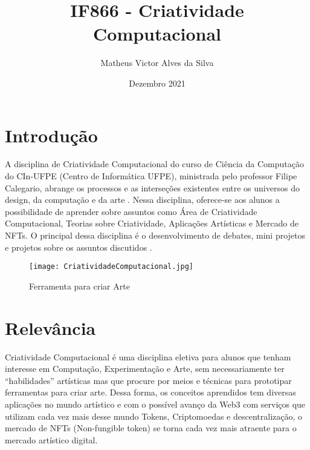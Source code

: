 \documentclass{article}
\title{IF866 - Criatividade Computacional}
\author{Matheus Victor Alves da Silva}
\date{\vspace{-5ex}}
\date{Dezembro 2021}
\begin{document}
\maketitle

\section{Introdução}
A disciplina de Criatividade Computacional do curso de Ciência da Computação do CIn-UFPE (Centro de Informática UFPE), ministrada pelo professor Filipe Calegario, abrange os processos e as interseções existentes entre os universos do design, da computação e da arte  \citep{SharePET}. Nessa disciplina, oferece-se aos alunos a possibilidade de aprender sobre assuntos como  Área de Criatividade Computacional, Teorias sobre Criatividade, Aplicações Artísticas e Mercado de NFTs. O principal dessa disciplina é o desenvolvimento de debates, mini projetos e projetos sobre os assuntos discutidos  \citep{Disciplina}.

\begin{figure}[h!]
\centering
\texttt{[image: CriatividadeComputacional.jpg]}
\caption{Ferramenta para criar Arte  \citep{Imagem}}
\label{fig: CriatividadeComputacional.jpg}
\end{figure}

\section{Relevância}
Criatividade Computacional é uma disciplina eletiva para alunos que tenham interesse em Computação, Experimentação e Arte, sem necessariamente ter “habilidades” artísticas mas que procure por meios e técnicas para prototipar ferramentas para criar arte. Dessa forma, os conceitos aprendidos tem diversas aplicações no mundo artístico e com o possível avanço da Web3 com serviços que utilizam cada vez mais desse mundo Tokens, Criptomoedas e descentralização, o mercado de NFTs (Non-fungible token) se torna cada vez mais atraente para o mercado artístico digital. 
\end{document}
